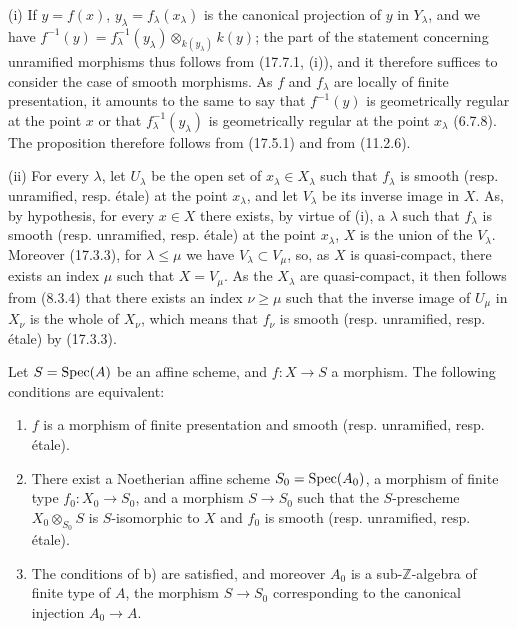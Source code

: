 (i) If $y=f(x)$, $y_\lambda=f_\lambda(x_\lambda)$ is the canonical projection of $y$ in $Y_\lambda$, and we have $f^{-1}(y)=f_\lambda^{-1}(y_\lambda)\otimes_{k(y_\lambda)}k(y)$; the part of the statement concerning unramified morphisms thus follows from (17.7.1, (i)), and it therefore suffices to consider the case of smooth morphisms. As $f$ and $f_\lambda$ are locally of finite presentation, it amounts to the same to say that $f^{-1}(y)$ is geometrically regular at the point $x$ or that $f_\lambda^{-1}(y_\lambda)$ is geometrically regular at the point $x_\lambda$ (6.7.8). The proposition therefore follows from (17.5.1) and from (11.2.6).

(ii) For every $\lambda$, let $U_\lambda$ be the open set of $x_\lambda\in X_\lambda$ such that $f_\lambda$ is smooth (resp. unramified, resp. étale) at the point $x_\lambda$, and let $V_\lambda$ be its inverse image in $X$. As, by hypothesis, for every $x\in X$ there exists, by virtue of (i), a $\lambda$ such that $f_\lambda$ is smooth (resp. unramified, resp. étale) at the point $x_\lambda$, $X$ is the union of the $V_\lambda$. Moreover (17.3.3), for $\lambda\leq\mu$ we have $V_\lambda\subset V_\mu$, so, as $X$ is quasi-compact, there exists an index $\mu$ such that $X=V_\mu$. As the $X_\lambda$ are quasi-compact, it then follows from (8.3.4) that there exists an index $\nu\geq\mu$ such that the inverse image of $U_\mu$ in $X_\nu$ is the whole of $X_\nu$, which means that $f_\nu$ is smooth (resp. unramified, resp. étale) by (17.3.3).

\begin{corollary}[17.7.9]
\label{IV.17.7.9}
Let $S=\operatorname{Spec}(A)$ be an affine scheme, and $f:X\to S$ a morphism. The following conditions are equivalent:
\begin{enumerate}
  \item[a)] $f$ is a morphism of finite presentation and smooth (resp. unramified, resp. étale).


  \item[b)] There exist a Noetherian affine scheme $S_0=\operatorname{Spec}(A_0)$, a morphism of finite type $f_0:X_0\to S_0$, and a morphism $S\to S_0$ such that the $S$-prescheme $X_0\otimes_{S_0}S$ is $S$-isomorphic to $X$ and $f_0$ is smooth (resp. unramified, resp. étale).
  \item[c)] The conditions of b) are satisfied, and moreover $A_0$ is a sub-$\mathbb{Z}$-algebra of finite type of $A$, the morphism $S\to S_0$ corresponding to the canonical injection $A_0\to A$.
\end{enumerate}
\end{corollary}

